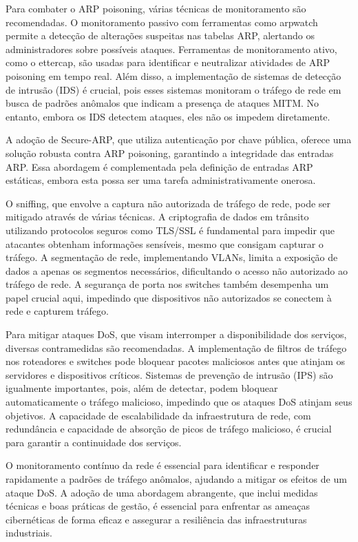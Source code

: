 Para combater o ARP poisoning, várias técnicas de monitoramento são recomendadas. O monitoramento passivo com ferramentas como arpwatch permite a detecção de alterações suspeitas nas tabelas ARP, alertando os administradores sobre possíveis ataques. Ferramentas de monitoramento ativo, como o ettercap, são usadas para identificar e neutralizar atividades de ARP poisoning em tempo real. Além disso, a implementação de sistemas de detecção de intrusão (IDS) é crucial, pois esses sistemas monitoram o tráfego de rede em busca de padrões anômalos que indicam a presença de ataques MITM. No entanto, embora os IDS detectem ataques, eles não os impedem diretamente.

A adoção de Secure-ARP, que utiliza autenticação por chave pública, oferece uma solução robusta contra ARP poisoning, garantindo a integridade das entradas ARP. Essa abordagem é complementada pela definição de entradas ARP estáticas, embora esta possa ser uma tarefa administrativamente onerosa.

O sniffing, que envolve a captura não autorizada de tráfego de rede, pode ser mitigado através de várias técnicas. A criptografia de dados em trânsito utilizando protocolos seguros como TLS/SSL é fundamental para impedir que atacantes obtenham informações sensíveis, mesmo que consigam capturar o tráfego. A segmentação de rede, implementando VLANs, limita a exposição de dados a apenas os segmentos necessários, dificultando o acesso não autorizado ao tráfego de rede. A segurança de porta nos switches também desempenha um papel crucial aqui, impedindo que dispositivos não autorizados se conectem à rede e capturem tráfego.

Para mitigar ataques DoS, que visam interromper a disponibilidade dos serviços, diversas contramedidas são recomendadas. A implementação de filtros de tráfego nos roteadores e switches pode bloquear pacotes maliciosos antes que atinjam os servidores e dispositivos críticos. Sistemas de prevenção de intrusão (IPS) são igualmente importantes, pois, além de detectar, podem bloquear automaticamente o tráfego malicioso, impedindo que os ataques DoS atinjam seus objetivos. A capacidade de escalabilidade da infraestrutura de rede, com redundância e capacidade de absorção de picos de tráfego malicioso, é crucial para garantir a continuidade dos serviços.

O monitoramento contínuo da rede é essencial para identificar e responder rapidamente a padrões de tráfego anômalos, ajudando a mitigar os efeitos de um ataque DoS. A adoção de uma abordagem abrangente, que inclui medidas técnicas e boas práticas de gestão, é essencial para enfrentar as ameaças cibernéticas de forma eficaz e assegurar a resiliência das infraestruturas industriais.

